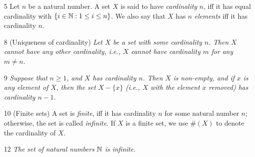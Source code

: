\begin{definition}{5}
    \label{cardinality-n}
    Let $n$ be a natural number. A set $X$ is said to have \emph{cardinality} $n$, iff it has equal cardinality with
    $\{i\in \mathbb{N} : 1\leq i\leq n\}$. We also say that $X$ has \emph{$n$ elements} iff it has cardinality $n$.
\end{definition}

\begin{proposition}{8}
    \label{cardinality-unique}
    (Uniqueness of cardinality) \emph{Let $X$ be a set with some cardinality $n$. Then $X$ cannot have any other
    cardinality, i.e., $X$ cannot have cardinality $m$ for any $m\neq n$.}
\end{proposition}

\begin{lemma}{9}
    \label{card-remove-element}
    \emph{Suppose that $n\geq 1$, and $X$ has cardinality $n$. Then $X$ is non-empty, and if $x$ is any element of $X$,
    then the set $X - \{x \}$ (i.e., $X$ with the element $x$ removed) has cardinality $n-1$.}
\end{lemma}

\begin{definition}{10}
    \label{finite-set}
    (Finite sets) A set is \emph{finite}, iff it has cardinality $n$ for some natural number $n$; otherwise, the set is
    called \emph{infinite}. If $X$ is a finite set, we use $\#(X)$ to denote the cardinality of $X$.
\end{definition}

\begin{theorem}{12}
    \label{nat-infinite}
    \emph{The set of natural numbers $\mathbb{N}$ is infinite.}
\end{theorem}


